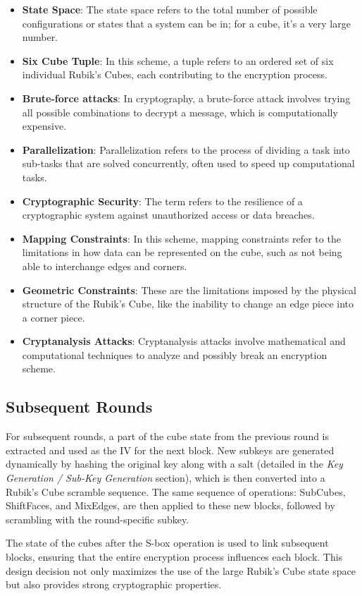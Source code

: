 \documentclass[12pt]{article}
\begin{document}
\begin{itemize}
    \item \textbf{State Space}: The state space refers to the total number of possible configurations or states that a system can be in; for a cube, it's a very large number.
    \item \textbf{Six Cube Tuple}: In this scheme, a tuple refers to an ordered set of six individual Rubik's Cubes, each contributing to the encryption process.
    \item \textbf{Brute-force attacks}: In cryptography, a brute-force attack involves trying all possible combinations to decrypt a message, which is computationally expensive.
    \item \textbf{Parallelization}: Parallelization refers to the process of dividing a task into sub-tasks that are solved concurrently, often used to speed up computational tasks.
    \item \textbf{Cryptographic Security}: The term refers to the resilience of a cryptographic system against unauthorized access or data breaches.
    \item \textbf{Mapping Constraints}: In this scheme, mapping constraints refer to the limitations in how data can be represented on the cube, such as not being able to interchange edges and corners.
    \item \textbf{Geometric Constraints}: These are the limitations imposed by the physical structure of the Rubik's Cube, like the inability to change an edge piece into a corner piece.
    \item \textbf{Cryptanalysis Attacks}: Cryptanalysis attacks involve mathematical and computational techniques to analyze and possibly break an encryption scheme.
\end{itemize}

\subsection{Subsequent Rounds}
For subsequent rounds, a part of the cube state from the previous round is extracted and used as the IV for the next block. New subkeys are generated dynamically by hashing the original key along with a salt (detailed in the \textit{Key Generation / Sub-Key Generation} section), which is then converted into a Rubik's Cube scramble sequence. The same sequence of operations: SubCubes, ShiftFaces, and MixEdges, are then applied to these new blocks, followed by scrambling with the round-specific subkey.

The state of the cubes after the S-box operation is used to link subsequent blocks, ensuring that the entire encryption process influences each block. This design decision not only maximizes the use of the large Rubik's Cube state space but also provides strong cryptographic properties.
\end{document}
